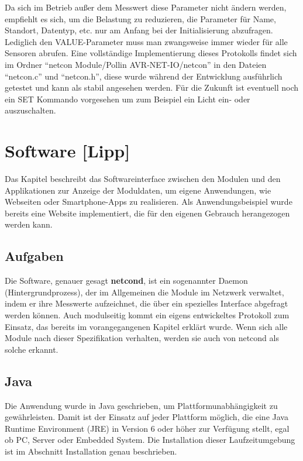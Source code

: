\documentclass[a4paper,14pt,headsepline]{scrartcl}
\begin{document}
Da sich im Betrieb außer dem Messwert diese Parameter nicht ändern werden, empfiehlt es sich, um die Belastung zu reduzieren, die Parameter für Name, Standort, Datentyp, etc. nur am Anfang bei der Initialisierung abzufragen. Lediglich den VALUE-Parameter muss man zwangsweise immer wieder für alle Sensoren abrufen. Eine vollständige Implementierung dieses Protokolls findet sich im Ordner "`netcon Module/Pollin AVR-NET-IO/netcon"' in den Dateien "`netcon.c"' und "`netcon.h"', diese wurde während der Entwicklung ausführlich getestet und kann als stabil angesehen werden. Für die Zukunft ist eventuell noch ein SET Kommando vorgesehen um zum Beispiel ein Licht ein- oder auszuschalten.

\newpage
\section{Software [Lipp]}

Das Kapitel beschreibt das Softwareinterface zwischen den Modulen und den Applikationen zur Anzeige der Moduldaten, um eigene Anwendungen, wie Webseiten oder Smartphone-Apps zu realisieren. Als Anwendungsbeispiel wurde bereits eine Website implementiert, die für den eigenen Gebrauch herangezogen werden kann.

\subsection{Aufgaben}
Die Software, genauer gesagt \textbf{netcond}, ist ein sogenannter Daemon (Hintergrundprozess), der im Allgemeinen die Module im Netzwerk verwaltet, indem er ihre Messwerte aufzeichnet, die über ein spezielles Interface abgefragt werden können. Auch modulseitig kommt ein eigens entwickeltes Protokoll zum Einsatz, das bereits im vorangegangenen Kapitel erklärt wurde. Wenn sich alle Module nach dieser Spezifikation verhalten, werden sie auch von netcond als solche erkannt.

\subsection{Java}

Die Anwendung wurde in Java geschrieben, um Plattformunabhängigkeit zu gewährleisten. Damit ist der Einsatz auf jeder Plattform möglich, die eine Java Runtime Environment (JRE) in Version 6 oder höher zur Verfügung stellt, egal ob PC, Server oder Embedded System. Die Installation dieser Laufzeitumgebung ist im Abschnitt Installation genau beschrieben. 
\end{document}
